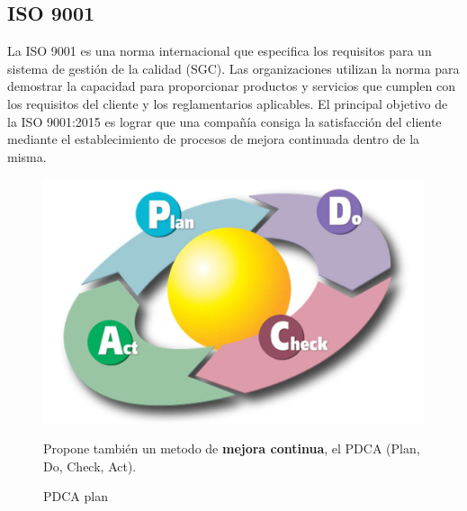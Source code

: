 \subsection{ISO 9001}

La ISO 9001 es una norma internacional que especifica los requisitos para un sistema de gestión de la calidad (SGC). Las organizaciones utilizan la norma para demostrar la capacidad para proporcionar productos y servicios que cumplen con los requisitos del cliente y los reglamentarios aplicables.
El principal objetivo de la ISO 9001:2015 es lograr que una compañía consiga la satisfacción del cliente mediante el establecimiento de procesos de mejora continuada dentro de la misma.

\begin{figure}[htbp]
   \centering
   \includegraphics{images/01/pdca.png}
   \caption{PDCA plan}
   \label{fig:01/pdca}
   Propone también un metodo de \textbf{mejora continua}, el PDCA (Plan, Do, Check, Act).
\end{figure}

